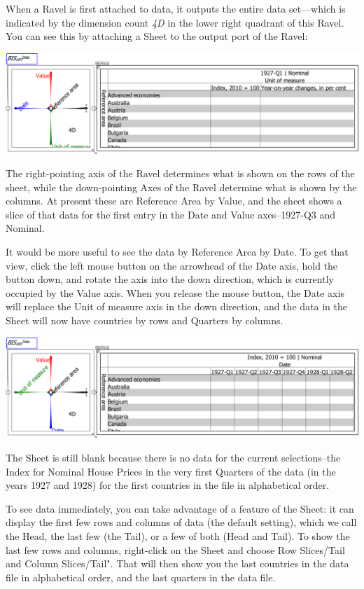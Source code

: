 When a Ravel is first attached to data, it outputs the entire data set---which is indicated by the dimension count \emph{4D} in the lower right quadrant of this Ravel. You can see this by attaching a Sheet to the output port of the Ravel:

\includegraphics{images/tut01Ravel4DwithSheet.eps}

The right-pointing axis of the Ravel determines what is shown on the rows of the sheet, while the down-pointing Axes of the Ravel determine what is shown by the columns. At present these are Reference Area by Value, and the sheet shows a slice of that data for the first entry in the Date and Value axes--1927-Q3 and Nominal.

It would be more useful to see the data by Reference Area by Date. To get that view, click the left mouse button on the arrowhead of the Date axis, hold the button down, and rotate the axis into the down direction, which is currently occupied by the Value axis. When you release the mouse button, the Date axis will replace the Unit of measure axis in the down direction, and the data in the Sheet will now have countries by rows and Quarters by columns.

\includegraphics{images/tut02HPI4DwithSheetRotatedCountryDate.eps}

The Sheet is still blank because there is no data for the current selections--the Index for Nominal House Prices in the very first Quarters of the data (in the years 1927 and 1928) for the first countries in the file in alphabetical order.

To see data immediately, you can take advantage of a feature of the Sheet: it can display the first few rows and columns of data (the default setting), which we call the Head, the last few (the Tail), or a few of both (Head and Tail). To show the last few rows and columns, right-click on the  Sheet and choose Row Slices/Tail and Column Slices/Tail". That will then show you the last countries in the data file in alphabetical order, and the last quarters in the data file.

